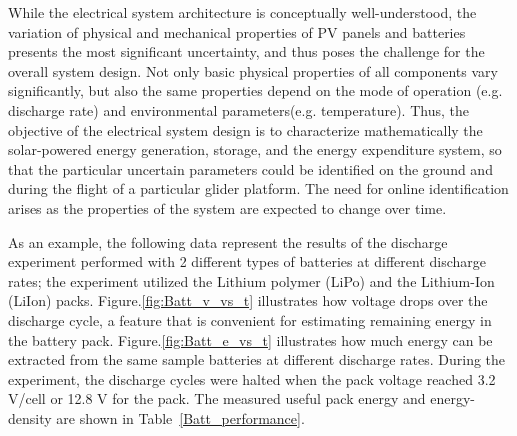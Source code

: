 \documentclass{ifacconf}
\begin{document}
While the electrical system architecture is conceptually well-understood, the variation
of physical and mechanical properties of PV panels and batteries presents the most
significant uncertainty, and thus poses the challenge for the overall system design. Not
only basic physical properties of all components vary significantly, but also the same
properties depend on the mode of operation (e.g. discharge rate) and environmental
parameters(e.g. temperature). Thus, the objective of the electrical system design is to
characterize mathematically the solar-powered energy generation, storage, and the energy
expenditure system, so that the particular uncertain parameters could be identified on
the ground and during the flight of a particular glider platform. The need for online
identification arises as the properties of the system are expected to change over time.

As an example, the following data represent the results of the discharge experiment
performed with 2 different types of batteries at different discharge rates; the
experiment utilized the Lithium polymer (LiPo) and the Lithium-Ion (LiIon) packs.
Figure.\ref{fig:Batt_v_vs_t} illustrates how voltage drops over the discharge cycle, a
feature that is convenient for estimating remaining energy in the battery pack.
Figure.\ref{fig:Batt_e_vs_t} illustrates how much energy can be extracted from the same
sample batteries at different discharge rates. During the experiment, the discharge
cycles were halted when the pack voltage reached 3.2 V/cell or 12.8 V for the pack. The
measured useful pack energy and energy-density are shown in Table~\ref{Batt_performance}.
\end{document}
